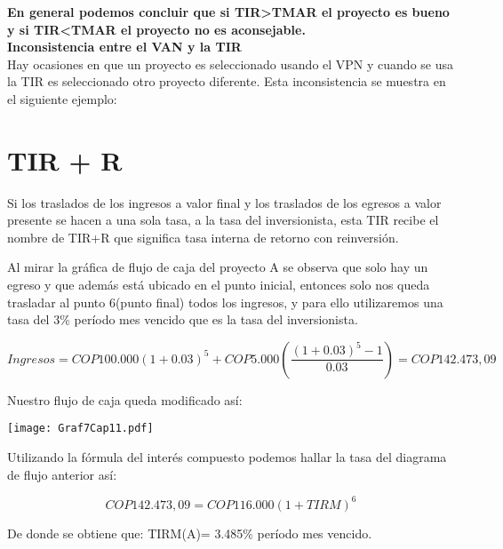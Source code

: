 \textbf{En general podemos concluir que si TIR>TMAR el proyecto es bueno y si TIR<TMAR el proyecto no es aconsejable.}\\

\textbf{Inconsistencia entre el VAN y la TIR}\\

Hay ocasiones en que un proyecto es seleccionado usando el VPN y cuando se usa la TIR es seleccionado otro proyecto diferente. Esta inconsistencia se muestra en el siguiente ejemplo:\\





\section{TIR + R}

Si los traslados de los ingresos a valor final y los traslados de los egresos a valor presente se hacen a una sola tasa, a la tasa del inversionista, esta TIR recibe el nombre de TIR+R que significa tasa interna de retorno con reinversión.

Al mirar la gráfica de flujo de caja del proyecto A se observa que solo hay un egreso y que además está ubicado en el punto inicial, entonces solo nos queda trasladar al punto 6(punto final) todos los ingresos, y para ello utilizaremos una tasa del 3\% período mes vencido que es la tasa del inversionista.
\begin{center}
	\begin{equation*}
		Ingresos =  COP  100.000(1+0.03)^{5}+ COP  5.000(\frac{(1+0.03)^{5}-1}{0.03})= COP  142.473,09
	\end{equation*}
\end{center}
Nuestro flujo de caja queda modificado así:\\
\begin{center}
	\texttt{[image: Graf7Cap11.pdf]}
\end{center}
Utilizando la fórmula del interés compuesto podemos hallar la tasa del diagrama de flujo anterior así:
\begin{center}
	\begin{equation*}
		 COP  142.473,09 =  COP  116.000(1+TIRM)^{6}
	\end{equation*}
\end{center}
De donde se obtiene que: TIRM(A)= 3.485\% período mes vencido.\\

